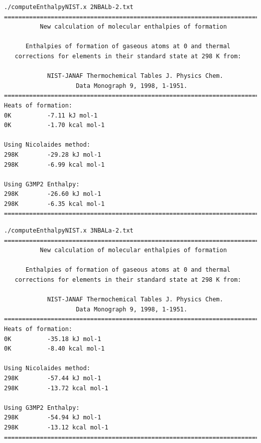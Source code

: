 \newpage

\begin{lstlisting}[caption = Output de 2NBALb-2.txt en EnthalpyNIST]
./computeEnthalpyNIST.x 2NBALb-2.txt
========================================================================
          New calculation of molecular enthalpies of formation

      Enthalpies of formation of gaseous atoms at 0 and thermal 
   corrections for elements in their standard state at 298 K from:

            NIST-JANAF Thermochemical Tables J. Physics Chem. 
                    Data Monograph 9, 1998, 1-1951.
========================================================================
Heats of formation:
0K          -7.11 kJ mol-1
0K          -1.70 kcal mol-1

Using Nicolaides method:
298K        -29.28 kJ mol-1
298K        -6.99 kcal mol-1

Using G3MP2 Enthalpy:
298K        -26.60 kJ mol-1
298K        -6.35 kcal mol-1
========================================================================
\end{lstlisting}

\newpage

\begin{lstlisting}[caption = Output de 3NBALa-2.txt en EnthalpyNIST]
./computeEnthalpyNIST.x 3NBALa-2.txt
========================================================================
          New calculation of molecular enthalpies of formation

      Enthalpies of formation of gaseous atoms at 0 and thermal 
   corrections for elements in their standard state at 298 K from:

            NIST-JANAF Thermochemical Tables J. Physics Chem. 
                    Data Monograph 9, 1998, 1-1951.
========================================================================
Heats of formation:
0K          -35.18 kJ mol-1
0K          -8.40 kcal mol-1

Using Nicolaides method:
298K        -57.44 kJ mol-1
298K        -13.72 kcal mol-1

Using G3MP2 Enthalpy:
298K        -54.94 kJ mol-1
298K        -13.12 kcal mol-1
========================================================================
\end{lstlisting}

\newpage

